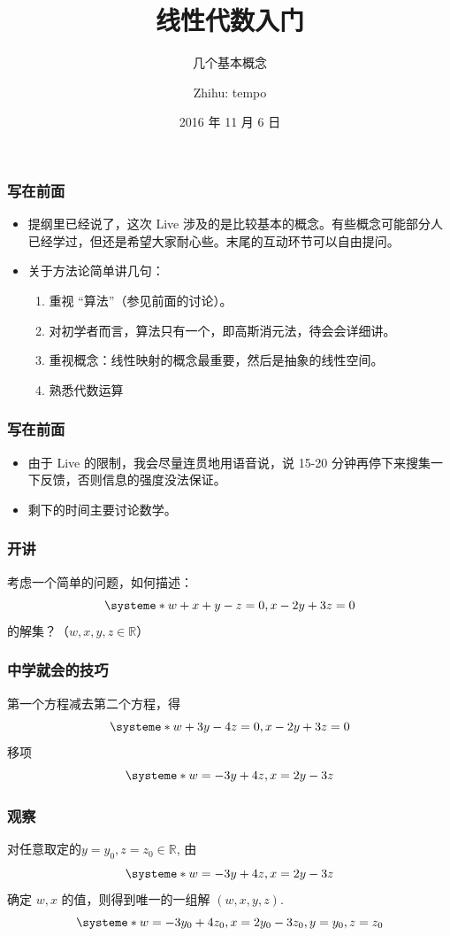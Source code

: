 \documentclass[CJK]{beamer}
\title{线性代数入门}
\subtitle{几个基本概念}
\author{Zhihu: tempo}
\date{2016 年 11 月 6 日}
\begin{document}
\begin{frame}
\titlepage
\end{frame}

\begin{frame}
\frametitle{写在前面}
\begin{itemize}
	\item 提纲里已经说了，这次 Live 涉及的是比较基本的概念。有些概念可能部分人已经学过，但还是希望大家耐心些。末尾的互动环节可以自由提问。
	\item 关于方法论简单讲几句：
	\begin{enumerate}
	\setlength\itemsep{0.5em}
	\item 重视 ``算法''（参见前面的讨论）。
	\item 对初学者而言，算法只有一个，即\alert{高斯消元法}，待会会详细讲。
	\item 重视概念：\alert{线性映射}的概念最重要，然后是抽象的\alert{线性空间}。
	\item 熟悉代数运算
    \end{enumerate}

\end{itemize}
\end{frame}

\begin{frame}
\frametitle{写在前面}
\begin{itemize}
	\setlength\itemsep{1.5em}
	\item 由于 Live 的限制，我会尽量连贯地用语音说，说 15-20 分钟再停下来搜集一下反馈，否则信息的强度没法保证。
    \item 剩下的时间主要讨论数学。

\end{itemize}
\end{frame}

\begin{frame}
\frametitle{开讲}
考虑一个简单的问题，如何描述：
\[
\systeme*{w + x + y - z = 0 , x - 2y + 3z = 0}
\]
的解集？（$w, x, y, z\in \mathbb{R}$）
\end{frame}

\begin{frame}
\frametitle{中学就会的技巧}
	第一个方程减去第二个方程，得
\[
\systeme*{w + 3y - 4z = 0, x - 2y + 3z = 0}
\]
移项
\[
\systeme*{w = -3y + 4z, x = 2y - 3z}
\]
\end{frame}

\begin{frame}
\frametitle{观察}
对任意取定的$y = y_0, z = z_0\in \mathbb R$, 由
\[
\systeme*{w = -3y + 4z, x = 2y - 3z}
\]
确定 $w, x$ 的值，则得到唯一的一组解 $(w,x,y,z)$.
\[
\systeme*{w = -3y_0 + 4z_0, x = 2y_0 - 3z_0, y = y_0, z = z_0}
\]
\end{frame}
\end{document}
